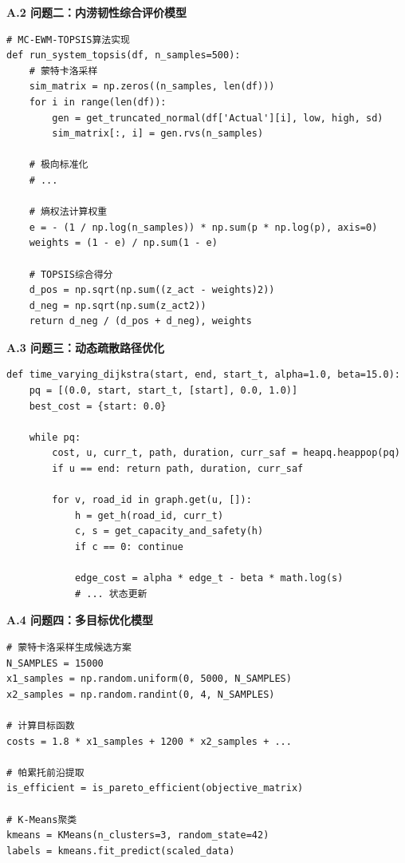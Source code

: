 \documentclass[12pt,a4paper]{article}
\begin{document}
{\fontsize{12pt}{14pt}\bfseries A.2 问题二：内涝韧性综合评价模型}

{\fontsize{10pt}{12pt}\ttfamily
\begin{verbatim}
# MC-EWM-TOPSIS算法实现
def run_system_topsis(df, n_samples=500):
    # 蒙特卡洛采样
    sim_matrix = np.zeros((n_samples, len(df)))
    for i in range(len(df)):
        gen = get_truncated_normal(df['Actual'][i], low, high, sd)
        sim_matrix[:, i] = gen.rvs(n_samples)
    
    # 极向标准化
    # ...
    
    # 熵权法计算权重
    e = - (1 / np.log(n_samples)) * np.sum(p * np.log(p), axis=0)
    weights = (1 - e) / np.sum(1 - e)
    
    # TOPSIS综合得分
    d_pos = np.sqrt(np.sum((z_act - weights)2))
    d_neg = np.sqrt(np.sum(z_act2))
    return d_neg / (d_pos + d_neg), weights
\end{verbatim}
}

{\fontsize{12pt}{14pt}\bfseries A.3 问题三：动态疏散路径优化}

{\fontsize{10pt}{12pt}\ttfamily
\begin{verbatim}
def time_varying_dijkstra(start, end, start_t, alpha=1.0, beta=15.0):
    pq = [(0.0, start, start_t, [start], 0.0, 1.0)]
    best_cost = {start: 0.0}
    
    while pq:
        cost, u, curr_t, path, duration, curr_saf = heapq.heappop(pq)
        if u == end: return path, duration, curr_saf
        
        for v, road_id in graph.get(u, []):
            h = get_h(road_id, curr_t)
            c, s = get_capacity_and_safety(h)
            if c == 0: continue
            
            edge_cost = alpha * edge_t - beta * math.log(s)
            # ... 状态更新
\end{verbatim}
}

{\fontsize{12pt}{14pt}\bfseries A.4 问题四：多目标优化模型}

{\fontsize{10pt}{12pt}\ttfamily
\begin{verbatim}
# 蒙特卡洛采样生成候选方案
N_SAMPLES = 15000
x1_samples = np.random.uniform(0, 5000, N_SAMPLES)
x2_samples = np.random.randint(0, 4, N_SAMPLES)

# 计算目标函数
costs = 1.8 * x1_samples + 1200 * x2_samples + ...

# 帕累托前沿提取
is_efficient = is_pareto_efficient(objective_matrix)

# K-Means聚类
kmeans = KMeans(n_clusters=3, random_state=42)
labels = kmeans.fit_predict(scaled_data)
\end{verbatim}
}
\end{document}
